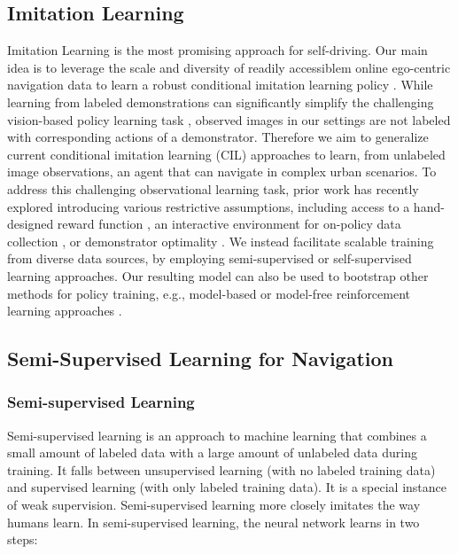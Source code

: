 \documentclass[letterpaper, 12pt]{book}
\theoremstyle{definition}
\theoremstyle{definition}
\theoremstyle{definition}
\theoremstyle{definition}
\theoremstyle{definition}
\begin{document}
\subsection{Imitation Learning}
\label{sec:org4707ac7}
Imitation Learning is the most promising approach for self-driving. Our main
idea is to leverage the scale and diversity of readily accessiblem online
ego-centric navigation data to learn a robust conditional imitation learning
policy \cite{Chen2019,Codevilla2017}. While learning from labeled demonstrations
can significantly simplify the challenging vision-based policy learning task
\cite{article,Bojarski2016,7410669,chen2021learning,Gupta2017,Hawke2019,Li2018,Liang2018,Mueller2018,inproceedings,Osa2018,Pomerleau1988,Prakash2021,Zhang2021,DBLP:journals/corr/abs-1912-02973,Zhou2019a},
observed images in our settings are not labeled with corresponding actions of a
demonstrator. Therefore we aim to generalize current conditional imitation
learning (CIL) approaches \cite{Chen2019,Codevilla2017,Codevilla2019} to learn,
from unlabeled image observations, an agent that can navigate in complex urban
scenarios. To address this challenging observational learning task, prior work
has recently explored introducing various restrictive assumptions, including
access to a hand-designed reward function \cite{Chang2020}, an interactive
environment for on-policy data collection \cite{torabi2018}, or demonstrator
optimality \cite{torabi2018,Torabi2019}. We instead facilitate scalable training
from diverse data sources, by employing semi-supervised or self-supervised
learning approaches. Our resulting model can also be used to bootstrap other
methods for policy training, e.g., model-based or model-free reinforcement
learning approaches \cite{chen2021learning,Liang2018,9157137,Toromanoff2019}.

\subsection{Semi-Supervised Learning for Navigation \label{org1ae921c}}
\label{sec:org468eee3}

\subsubsection{Semi-supervised Learning}
\label{sec:org23681e8}
Semi-supervised learning is an approach to machine learning that combines a
small amount of labeled data with a large amount of unlabeled data during
training. It falls between unsupervised learning (with no labeled training data)
and supervised learning (with only labeled training data). It is a special
instance of weak supervision. Semi-supervised learning more closely imitates the
way humans learn. In semi-supervised learning, the neural network learns in two
steps:
\end{document}
